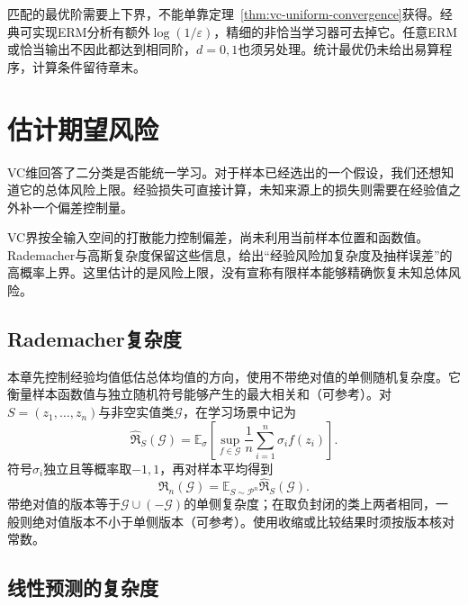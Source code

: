 匹配的最优阶需要上下界，不能单靠定理~\ref{thm:vc-uniform-convergence}获得。经典可实现ERM分析有额外$\log(1/\varepsilon)$，精细的非恰当学习器可去掉它。任意ERM或恰当输出不因此都达到相同阶，$d=0,1$也须另处理。统计最优仍未给出易算程序，计算条件留待章末。

\section{估计期望风险}
\label{sec:rademacher-complexity}

VC维回答了二分类是否能统一学习。对于样本已经选出的一个假设，我们还想知道它的总体风险上限。经验损失可直接计算，未知来源上的损失则需要在经验值之外补一个偏差控制量。

VC界按全输入空间的打散能力控制偏差，尚未利用当前样本位置和函数值。Rademacher与高斯复杂度保留这些信息，给出“经验风险加复杂度及抽样误差”的高概率上界。这里估计的是风险上限，没有宣称有限样本能够精确恢复未知总体风险。

\subsection{Rademacher复杂度}

本章先控制经验均值低估总体均值的方向，使用不带绝对值的单侧随机复杂度。它衡量样本函数值与独立随机符号能够产生的最大相关和（可参考）。对$S=(z_1,\ldots,z_n)$与非空实值类$\mathcal G$，在学习场景中记为
\begin{equation}
 \widehat{\mathfrak R}_S(\mathcal G)
 =\mathbb E_\sigma\left[\sup_{f\in\mathcal G}
       \frac1n\sum_{i=1}^n\sigma_i f(z_i)\right].
 \label{eq:learning-empirical-rademacher}
\end{equation}
符号$\sigma_i$独立且等概率取$-1,1$，再对样本平均得到
\[
 \mathfrak R_n(\mathcal G)=\mathbb E_{S\sim\mathcal P^n}
       \widehat{\mathfrak R}_S(\mathcal G).
\]
带绝对值的版本等于$\mathcal G\cup(-\mathcal G)$的单侧复杂度；在取负封闭的类上两者相同，一般则绝对值版本不小于单侧版本（可参考）。使用收缩或比较结果时须按版本核对常数。

\subsection{线性预测的复杂度}

